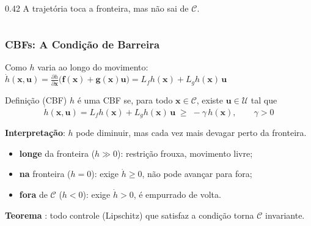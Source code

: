 \begin{frame}
\begin{columns}[c]
\begin{column}{0.42\textwidth}
            {\scriptsize A trajetória toca a fronteira, mas não sai de $\mathcal{C}$.}
        \end{column}

    \end{columns}

\end{frame}


\begin{frame}

    \frametitle{CBFs: A Condição de Barreira}

    Como $h$ varia ao longo do movimento:
    \(
        \dot{h}(\boldsymbol{x}, \boldsymbol{u})
        = \frac{\partial h}{\partial \boldsymbol{x}} \big(\boldsymbol{f}(\boldsymbol{x}) + \boldsymbol{g}(\boldsymbol{x})\boldsymbol{u}\big)
        = L_f h(\boldsymbol{x}) + L_g h(\boldsymbol{x})\, \boldsymbol{u}
    \)

    \begin{block}{Definição (CBF)}
        $h$ é uma CBF se, para todo $\boldsymbol{x} \in \mathcal{C}$, existe $\boldsymbol{u} \in \mathcal{U}$ tal que
        \[
            \dot{h}(\boldsymbol{x}, \boldsymbol{u}) = L_f h(\boldsymbol{x}) + L_g h(\boldsymbol{x})\, \boldsymbol{u} \;\geq\; -\gamma\, h(\boldsymbol{x}), \qquad \gamma > 0
        \]
    \end{block}

    \textbf{Interpretação}: $h$ pode diminuir, mas cada vez mais devagar perto da fronteira.
    \begin{itemize}
        \item \textbf{longe} da fronteira ($h \gg 0$): restrição frouxa, movimento livre;
        \item \textbf{na} fronteira ($h = 0$): exige $\dot{h} \geq 0$, não pode avançar para fora;
        \item \textbf{fora} de $\mathcal{C}$ ($h < 0$): exige $\dot{h} > 0$, é empurrado de volta.
    \end{itemize}

    {\small \textbf{Teorema} \cite{ames2019cbf}: todo controle (Lipschitz) que satisfaz a condição torna $\mathcal{C}$ invariante.}

\end{frame}



